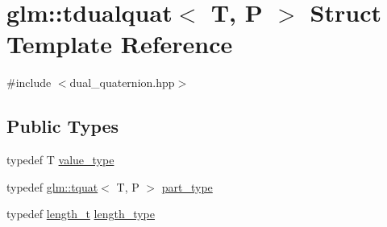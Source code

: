 \hypertarget{structglm_1_1tdualquat}{}\section{glm\+::tdualquat$<$ T, P $>$ Struct Template Reference}
\label{structglm_1_1tdualquat}


{\ttfamily \#include $<$dual\+\_\+quaternion.\+hpp$>$}

\subsection*{Public Types}
\begin{DoxyCompactItemize}
\item 
typedef T \mbox{\hyperlink{structglm_1_1tdualquat_afcff3aadbc6e5c5672e2af653a5e401c}{value\+\_\+type}}
\item 
typedef \mbox{\hyperlink{structglm_1_1tquat}{glm\+::tquat}}$<$ T, P $>$ \mbox{\hyperlink{structglm_1_1tdualquat_a496a3e08262a28863cf7b0609eee7e5b}{part\+\_\+type}}
\item 
typedef \mbox{\hyperlink{namespaceglm_a090a0de2260835bee80e71a702492ed9}{length\+\_\+t}} \mbox{\hyperlink{structglm_1_1tdualquat_a8100706ca94a1aa6611874787a9be0ca}{length\+\_\+type}}
\end{DoxyCompactItemize}
